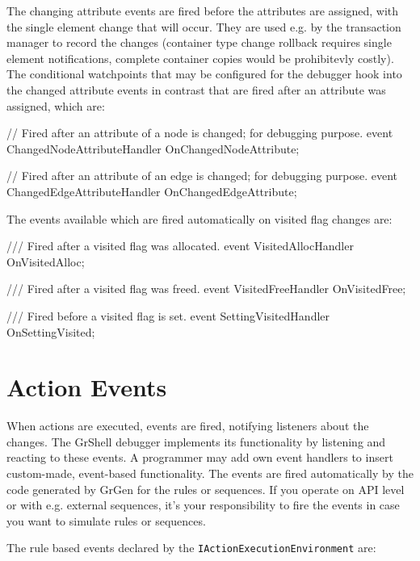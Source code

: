 The changing attribute events are fired before the attributes are assigned, with the single element change that will occur. They are used e.g. by the transaction manager to record the changes (container type change rollback requires single element notifications, complete container copies would be prohibitevly costly). The conditional watchpoints that may be configured for the debugger hook into the changed attribute events in contrast that are fired after an attribute was assigned, which are:

\begin{csharplet}
// Fired after an attribute of a node is changed; for debugging purpose.
event ChangedNodeAttributeHandler OnChangedNodeAttribute;

// Fired after an attribute of an edge is changed; for debugging purpose.
event ChangedEdgeAttributeHandler OnChangedEdgeAttribute;
\end{csharplet}

The events available which are fired automatically on visited flag changes are:

\begin{csharplet}
/// Fired after a visited flag was allocated.
event VisitedAllocHandler OnVisitedAlloc;

/// Fired after a visited flag was freed.
event VisitedFreeHandler OnVisitedFree;

/// Fired before a visited flag is set.
event SettingVisitedHandler OnSettingVisited;
\end{csharplet}

\section{Action Events}\label{sec:actionevent}

When actions are executed, events are fired, notifying listeners about the changes.
The GrShell debugger implements its functionality by listening and reacting to these events.
A programmer may add own event handlers to insert custom-made, event-based functionality.
The events are fired automatically by the code generated by GrGen for the rules or sequences.
If you operate on API level or with e.g. external sequences, it's your responsibility to fire the events in case you want to simulate rules or sequences.

The rule based events declared by the \texttt{IActionExecutionEnvironment} are:

